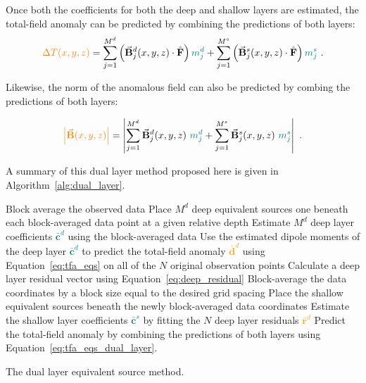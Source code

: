 Once both the coefficients for both the deep and shallow layers are estimated, the total-field anomaly can be predicted by combining the predictions of both layers:
\begin{equation}
    \label{eq:tfa_eqs_dual_layer}
  \textcolor{orange}{\Delta T (x, y, z)} = \sum_{j=1}^{M^d} \left(\vec{\mathbf{B}}^d_j(x, y, z) \cdot \hat{\mathbf{F}}\right) \textcolor{teal}{m_j^d}
  +  \sum_{j=1}^{M^s} \left(\vec{\mathbf{B}}^s_j(x, y, z) \cdot \hat{\mathbf{F}}\right) \textcolor{teal}{m_j^s}
  \ .
\end{equation}

\noindent
Likewise, the norm of the anomalous field can also be predicted by combing the predictions of both layers:

\begin{equation}
  \textcolor{orange}{\left\lvert \vec{\mathbf{B}}(x,y,z) \right\rvert} = 
  \left\lvert \sum_{j=1}^{M^d} \vec{\mathbf{B}}^d_{j}(x,y,z)\ \textcolor{teal}{m^d_j}
  +
  \sum_{j=1}^{M^s}  \vec{\mathbf{B}}^s_{j}(x,y,z)\ \textcolor{teal}{m^s_j}
  \right\rvert
  \ .
\end{equation}

A summary of this dual layer method proposed here is given in Algorithm~\ref{alg:dual_layer}.

\begin{algorithm}[!h]
  Block average the observed data
  \;
  Place $M^d$ deep equivalent sources one beneath each block-averaged data point at a given relative depth
  \;
  Estimate $M^d$ deep layer coefficients \textcolor{teal}{$\bar{\mathbf{c}}^d$} using the block-averaged data 
  \;
  Use the estimated dipole moments of the deep layer \textcolor{teal}{$\bar{\mathbf{c}}^d$} to predict the total-field anomaly \textcolor{orange}{$\bar{\mathbf{d}}^d$} using Equation~\ref{eq:tfa_eqs} on all of the $N$ original observation points
  \;
  Calculate a deep layer residual vector using Equation~\ref{eq:deep_residual}
  \;
  Block-average the data coordinates by a block size equal to the desired grid spacing
  \;
  Place the shallow equivalent sources beneath the newly block-averaged data coordinates
  \;
  Estimate the shallow layer coefficients \textcolor{teal}{$\bar{\mathbf{c}}^s$} by fitting the $N$ deep layer residuals \textcolor{orange}{$\bar{\mathbf{r}}^d$}
  \;
   Predict the total-field anomaly by combining the predictions of both layers using Equation~\ref{eq:tfa_eqs_dual_layer}.
  \BlankLine
  \caption{The dual layer equivalent source method.}
  \label{alg:dual_layer}
\end{algorithm}


